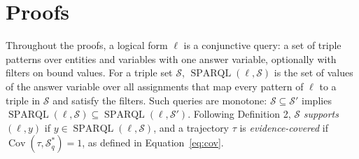 \appendix

\section{Proofs}
\label{app:proofs}
Throughout the proofs, a logical form $\ell$ is a conjunctive query: a set of triple patterns over entities and variables with one answer variable, optionally with filters on bound values. For a triple set $\mathcal{S}$, $\operatorname{SPARQL}(\ell,\mathcal{S})$ is the set of values of the answer variable over all assignments that map every pattern of $\ell$ to a triple in $\mathcal{S}$ and satisfy the filters. Such queries are monotone: $\mathcal{S}\subseteq\mathcal{S}'$ implies $\operatorname{SPARQL}(\ell,\mathcal{S})\subseteq\operatorname{SPARQL}(\ell,\mathcal{S}')$. Following Definition 2, $\mathcal{S}$ \emph{supports} $(\ell,y)$ if $y\in\operatorname{SPARQL}(\ell,\mathcal{S})$, and a trajectory $\tau$ is \emph{evidence-covered} if $\operatorname{Cov}(\tau,\mathcal{S}^{*}_{q})=1$, as defined in Equation~\ref{eq:cov}.

